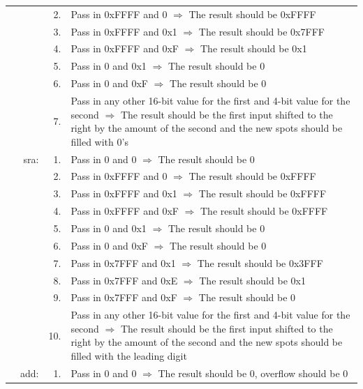 \documentclass{article}
\begin{document}
\begin{longtable}{ r r r p{11cm} }
				                &      & 2. & Pass in 0xFFFF and 0 $\Rightarrow$ The result should be 0xFFFF\\
				                &      & 3. & Pass in 0xFFFF and 0x1 $\Rightarrow$ The result should be 0x7FFF\\
				                &      & 4. & Pass in 0xFFFF and 0xF $\Rightarrow$ The result should be 0x1\\
				                &      & 5. & Pass in 0 and 0x1 $\Rightarrow$ The result should be 0\\
				                &      & 6. & Pass in 0 and 0xF $\Rightarrow$ The result should be 0\\
				                &      & 7. & Pass in any other 16-bit value for the first and 4-bit value for the second $\Rightarrow$ The result should be the first input shifted to the right by the amount of the second and the new spots should be filled with 0's\\
				                & sra: & 1. & Pass in 0 and 0 $\Rightarrow$ The result should be 0\\
				                &      & 2. & Pass in 0xFFFF and 0 $\Rightarrow$ The result should be 0xFFFF\\
				                &      & 3. & Pass in 0xFFFF and 0x1 $\Rightarrow$ The result should be 0xFFFF\\
				                &      & 4. & Pass in 0xFFFF and 0xF $\Rightarrow$ The result should be 0xFFFF\\
				                &      & 5. & Pass in 0 and 0x1 $\Rightarrow$ The result should be 0\\
				                &      & 6. & Pass in 0 and 0xF $\Rightarrow$ The result should be 0\\
				                &      & 7. & Pass in 0x7FFF and 0x1 $\Rightarrow$ The result should be 0x3FFF\\
				                &      & 8. & Pass in 0x7FFF and 0xE $\Rightarrow$ The result should be 0x1\\
				                &      & 9. & Pass in 0x7FFF and 0xF $\Rightarrow$ The result should be 0\\
				                &      & 10.& Pass in any other 16-bit value for the first and 4-bit value for the second $\Rightarrow$ The result should be the first input shifted to the right by the amount of the second and the new spots should be filled with the leading digit\\
				                & add: & 1. & Pass in 0 and 0 $\Rightarrow$ The result should be 0, overflow should be 0\\

\end{longtable}
\end{document}
